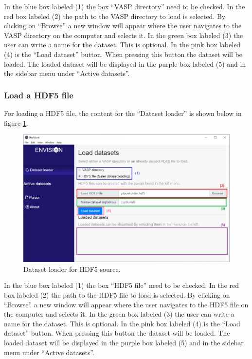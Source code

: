In the blue box labeled (1) the box ``VASP directory'' need to be checked. In the red box labeled (2) the path to the VASP directory to load is selected. By clicking on ``Browse'' a new window will appear where the user navigates to the VASP directory on the computer and selects it. In the green box labeled (3) the user can write a name for the dataset. This is optional. In the pink box labeled (4) is the ``Load dataset'' button. When pressing this button the dataset will be loaded. The loaded dataset will be displayed in the purple box labeled (5) and in the sidebar menu under ``Active datasets''.

\subsubsection{Load a HDF5 file}
For loading a HDF5 file, the content for the ``Dataset loader'' is shown below in figure \ref{fig:GUIDatasetloaderHDF5}.

\begin{figure}[H]
    \centering
    \includegraphics[scale = 0.45]{images/GUI.Datasetloader_HDF5.png}
    \caption{Dataset loader for HDF5 source.}
    \label{fig:GUIDatasetloaderHDF5}
\end{figure}

In the blue box labeled (1) the box ``HDF5 file'' need to be checked. In the red box labeled (2) the path to the HDF5 file to load is selected. By clicking on ``Browse'' a new window will appear where the user navigates to the HDF5 file on the computer and selects it. In the green box labeled (3) the user can write a name for the dataset. This is optional. In the pink box labeled (4) is the ``Load dataset'' button. When pressing this button the dataset will be loaded. The loaded dataset will be displayed in the purple box labeled (5) and in the sidebar menu under ``Active datasets''.

